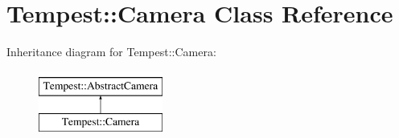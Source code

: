 \hypertarget{class_tempest_1_1_camera}{\section{Tempest\+:\+:Camera Class Reference}
\label{class_tempest_1_1_camera}
}
Inheritance diagram for Tempest\+:\+:Camera\+:\begin{figure}[H]
\begin{center}
\leavevmode
\includegraphics[height=2.000000cm]{class_tempest_1_1_camera}
\end{center}
\end{figure}
